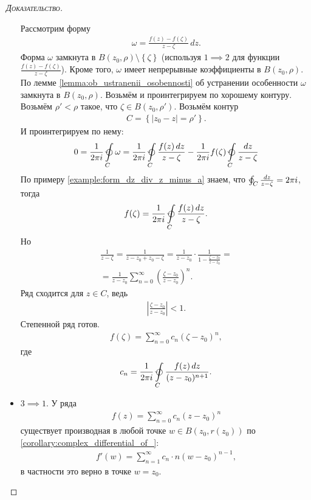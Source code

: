 \documentclass[../complex-analysis.tex]{subfiles}
\begin{document}
\begin{proof}[\normalfont\textsc{Доказательство}]
\begin{itemize}
 Рассмотрим форму
 \begin{align*}
  \omega = \frac{f(z) - f(\zeta)}{z-\zeta}\,dz.
 \end{align*} Форма $\omega$ замкнута в $B(z_0, \rho) \setminus \left\{ \zeta \right\}$ (используя $1 \implies 2$ для функции $\frac{f(z) - f(\zeta)}{z-\zeta}$). Кроме того, $\omega$ имеет непрерывные коэффициенты в $B(z_0, \rho)$. По лемме \ref{lemma:ob_ustranenii_osobennosti} об устранении особенности $\omega$ замкнута в $B(z_0, \rho)$. Возьмём и проинтегрируем по хорошему контуру. Возьмём $\rho' < \rho$ такое, что $\zeta \in B(z_0, \rho')$. Возьмём контур
 \begin{align*}
  C = \left\{ \left| z_0 - z \right| = \rho' \right\}.
 \end{align*} И проинтегрируем по нему:
 \begin{align*}
  0=\frac{1}{2\pi i} \varointctrclockwise\limits_{C} \omega  = \frac{1}{2\pi i} \varointctrclockwise\limits_{C} \frac{f(z)\,dz}{z - \zeta}  - \frac{1}{2\pi i} f(\zeta) \varointctrclockwise\limits_{C} \frac{dz}{z - \zeta} 
 \end{align*}
 По примеру \ref{example:form_dz_div_z_minus_a} знаем, что $\varointctrclockwise_{C} \frac{dz}{z - \zeta} = 2 \pi i$, тогда 
 \begin{align*}
  f(\zeta) = \frac{1}{2\pi i} \varointctrclockwise\limits_{C} \frac{f(z)\,dz}{z - \zeta}.
 \end{align*} Но
 \begin{align*}
  \frac{1}{z - \zeta} = \frac{1}{z - z_0 + z_0 - \zeta} = \frac{1}{z - z_0} \cdot \frac{1}{1 -  \frac{\zeta - z_0}{z - z_0}} = \\
  = \frac{1}{z-z_0} \sum_{n=0}^{\infty} \left( \frac{\zeta-z_0}{z-z_0} \right)^{n}.
 \end{align*} Ряд сходится для $z \in C$, ведь
 \begin{align*}
  \left| \frac{\zeta - z_0}{z-z_0} \right| < 1.
 \end{align*}
 Степенной ряд готов.
 \begin{align*}
  f(\zeta) = \sum_{n=0}^{\infty} c_n \left( \zeta - z_0 \right)^{n},
 \end{align*} где
 \begin{align*}
  c_n = \frac{1}{2\pi i} \varointctrclockwise\limits_{C} \frac{f(z)\,dz}{(z - z_0)^{n + 1}}.
 \end{align*} 

\item $ 3 \implies 1 $. У ряда 
 \begin{align*}
  f(z) = \sum_{n=0}^{\infty}c_n(z-z_0)^{n}
\end{align*} существует производная в любой точке $ w \in B(z_0, r(z_0))$ по \eqref{corollary:complex_differential_of_}:
 \begin{align*}
  f'(w) = \sum_{n=1}^{\infty} c_n \cdot n(w - z_0)^{n-1},
 \end{align*} в частности это верно в точке  $ w = z_0 $.
 

\end{itemize}
\end{proof}
\end{document}
